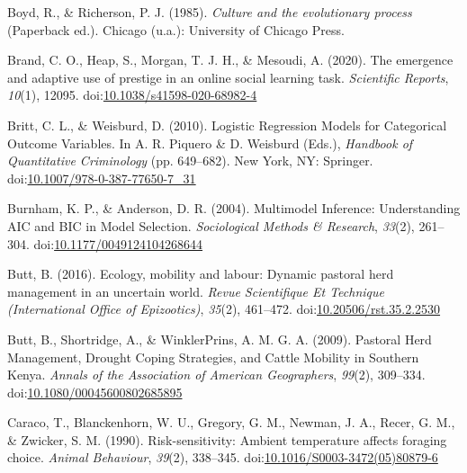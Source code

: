 \documentclass[
  11pt,
]{article}
\begin{document}
\leavevmode\hypertarget{ref-boydCultureEvolutionaryProcess1985}{}%
Boyd, R., \& Richerson, P. J. (1985). \emph{Culture and the evolutionary
process} (Paperback ed.). Chicago (u.a.): University of Chicago Press.

\leavevmode\hypertarget{ref-brandEmergenceAdaptiveUse2020}{}%
Brand, C. O., Heap, S., Morgan, T. J. H., \& Mesoudi, A. (2020). The
emergence and adaptive use of prestige in an online social learning
task. \emph{Scientific Reports}, \emph{10}(1), 12095.
doi:\href{https://doi.org/10.1038/s41598-020-68982-4}{10.1038/s41598-020-68982-4}

\leavevmode\hypertarget{ref-brittLogisticRegressionModels2010}{}%
Britt, C. L., \& Weisburd, D. (2010). Logistic Regression Models for
Categorical Outcome Variables. In A. R. Piquero \& D. Weisburd (Eds.),
\emph{Handbook of Quantitative Criminology} (pp. 649--682). New York,
NY: Springer.
doi:\href{https://doi.org/10.1007/978-0-387-77650-7_31}{10.1007/978-0-387-77650-7\_31}

\leavevmode\hypertarget{ref-burnhamMultimodelInferenceUnderstanding2004}{}%
Burnham, K. P., \& Anderson, D. R. (2004). Multimodel Inference:
Understanding AIC and BIC in Model Selection. \emph{Sociological Methods
\& Research}, \emph{33}(2), 261--304.
doi:\href{https://doi.org/10.1177/0049124104268644}{10.1177/0049124104268644}

\leavevmode\hypertarget{ref-buttEcologyMobilityLabour2016}{}%
Butt, B. (2016). Ecology, mobility and labour: Dynamic pastoral herd
management in an uncertain world. \emph{Revue Scientifique Et Technique
(International Office of Epizootics)}, \emph{35}(2), 461--472.
doi:\href{https://doi.org/10.20506/rst.35.2.2530}{10.20506/rst.35.2.2530}

\leavevmode\hypertarget{ref-buttPastoralHerdManagement2009}{}%
Butt, B., Shortridge, A., \& WinklerPrins, A. M. G. A. (2009). Pastoral
Herd Management, Drought Coping Strategies, and Cattle Mobility in
Southern Kenya. \emph{Annals of the Association of American
Geographers}, \emph{99}(2), 309--334.
doi:\href{https://doi.org/10.1080/00045600802685895}{10.1080/00045600802685895}

\leavevmode\hypertarget{ref-caracoRisksensitivityAmbientTemperature1990}{}%
Caraco, T., Blanckenhorn, W. U., Gregory, G. M., Newman, J. A., Recer,
G. M., \& Zwicker, S. M. (1990). Risk-sensitivity: Ambient temperature
affects foraging choice. \emph{Animal Behaviour}, \emph{39}(2),
338--345.
doi:\href{https://doi.org/10.1016/S0003-3472(05)80879-6}{10.1016/S0003-3472(05)80879-6}
\end{document}
